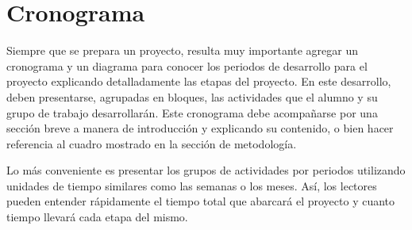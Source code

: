 \section*{Cronograma}
\justifying
Siempre que se prepara un proyecto, resulta muy importante agregar un cronograma
y un diagrama para conocer los periodos de desarrollo para el proyecto explicando
detalladamente las etapas del proyecto. En este desarrollo, deben presentarse,
agrupadas en bloques, las actividades que el alumno y su grupo de trabajo
desarrollarán. Este cronograma debe acompañarse por una sección breve a manera
de introducción y explicando su contenido, o bien hacer referencia al cuadro
mostrado en la sección de metodología.

Lo más conveniente es presentar los grupos de actividades por periodos utilizando
unidades de tiempo similares como las semanas o los meses. Así, los lectores
pueden entender rápidamente el tiempo total que abarcará el proyecto y
cuanto tiempo llevará cada etapa del mismo.
